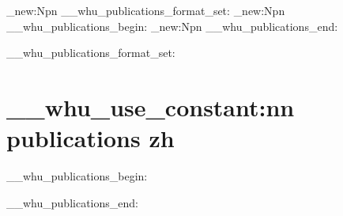 

\cs_new:Npn \__whu_publications_format_set: { }
\cs_new:Npn \__whu_publications_begin: { }
\cs_new:Npn \__whu_publications_end: { }
 {}
  {
    \__whu_publications_format_set:
    \chapter
      [
        \__whu_use_constant:nn { publications } { zh-toc }
      ]
      {
        \__whu_use_constant:nn { publications } { zh }
      }
    \__whu_publications_begin:
  }
  { 
    \__whu_publications_end:
  }